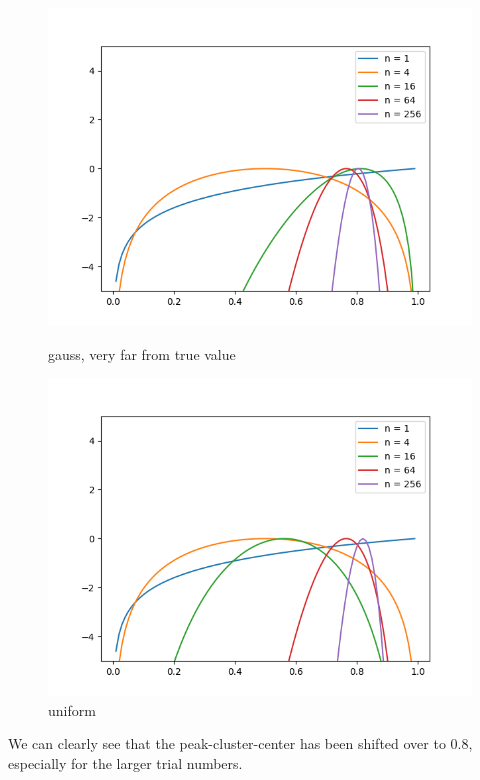 \documentclass[english]{scrartcl}
\begin{document}
\begin{figure}[H]
	\endminipage \hfill
	\includegraphics[width=\linewidth]{coin/h=0.8/gauss_far}
	\caption{gauss, very far from true value} 
	\endminipage \hfill
	\includegraphics[width=\linewidth]{coin/h=0.8/unif}
	\caption{uniform} 
	\endminipage \hfill
\end{figure}

\par We can clearly see that the peak-cluster-center has been shifted over to 0.8, especially for the larger trial numbers.
\end{document}
